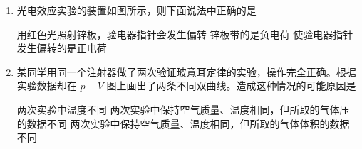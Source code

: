\documentclass[\gkver]{gaokaozhenti}
\begin{document}
\begin{enumerate}
{$s_{2}=340\times(1.32-1.17)\Um=51\Um$，

第 5 步，算出 A 与 B 的距离

$\Delta s=s_{1}-s_{2}=68\Um-51\Um=17\Um$，

这就是汽车在接收 $P_{1}$、$P_{2}$ 两个时刻发出的超声波信号中间前进的距离。

第 6 步，算出汽车从 A 到 B 用的时间为

$\Delta t=1.32\Us-0.37\Us=0.95\Us$，

第 7 步，算出汽车的速度为

$v=\frac{\Delta s}{\Delta t}=\frac{17}{0.95}=17.9\Ums=64\Ukmh$。
}

\item
光电效应实验的装置如图所示，则下面说法中正确的是


{用红色光照射锌板，验电器指针会发生偏转}
{锌板带的是负电荷}
{使验电器指针发生偏转的是正电荷}


\item
某同学用同一个注射器做了两次验证玻意耳定律的实验，操作完全正确。根据实验数据却在 $p-V$ 图上画出了两条不同双曲线。造成这种情况的可能原因是

\onepicture[align=right, w=4.50cm]{}

{两次实验中温度不同}
{两次实验中保持空气质量、温度相同，但所取的气体压的数据不同}
{两次实验中保持空气质量、温度相同，但所取的气体体积的数据不同}



\end{enumerate}
\end{document}
